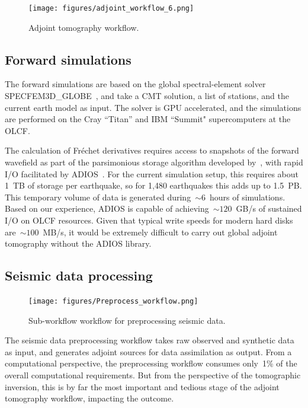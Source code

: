 \documentclass[extra,mreferee]{gji}
\begin{document}
\begin{figure}
  \centering
  \texttt{[image: figures/adjoint\_workflow\_6.png]}
  \caption{\small{Adjoint tomography workflow.}}
  \label{fig:adjoint_workflow}
\end{figure}

\subsection{Forward simulations}

The forward simulations are based on the global spectral-element solver
SPECFEM3D\_GLOBE~\citep{KoTr02a,KoTr02a}, and take a CMT solution, a list
of stations, and the current earth model as input.
The solver is GPU accelerated, and the simulations are performed on the Cray ``Titan'' and IBM ``Summit" supercomputers
at the OLCF.

The calculation of Fr\'echet derivatives requires
access to snapshots of the forward wavefield as part of the parsimonious storage
algorithm developed by~\cite{KoXiBoPeSaLiTr16},
with rapid I/O facilitated by ADIOS~\citep{liu2014hello}.
For the current simulation setup,
this requires about 1~TB of storage per earthquake,
so for 1,480 earthquakes this adds up to 1.5~PB.
This temporary volume of data is generated during~$\sim6$~hours of simulations.
Based on our experience, ADIOS is capable of achieving~$\sim120$~GB/s
of sustained I/O on OLCF resources.
Given that typical write speeds for modern hard disks are~$\sim100$~MB/s,
it would be extremely difficult to carry out global adjoint tomography without the ADIOS library.

\subsection{Seismic data processing}

\begin{figure}
  \centering
  \texttt{[image: figures/Preprocess\_workflow.png]}
  \caption{\small{Sub-workflow workflow for preprocessing seismic data.}}
  \label{fig:preprocess_workflow}
\end{figure}

The seismic data preprocessing workflow takes raw observed and synthetic data as input,
and generates adjoint sources for data assimilation as output.
From a computational perspective, the preprocessing workflow consumes only~1\%
of the overall computational requirements.
But from the perspective of the tomographic inversion, this is by far the most
important and tedious stage of the adjoint tomography workflow,
impacting the outcome.
\end{document}
